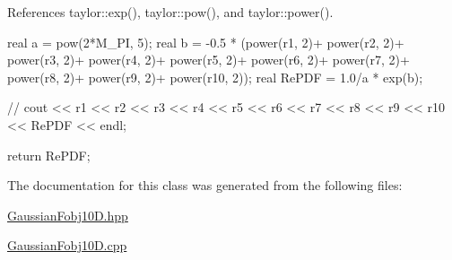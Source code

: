 \-References taylor\-::exp(), taylor\-::pow(), and taylor\-::power().


\begin{DoxyCode}
{
    real a = pow(2*M_PI, 5);
    real b = -0.5 * (power(r1, 2)+ power(r2, 2)+ power(r3, 2)+
        power(r4, 2)+ power(r5, 2)+ power(r6, 2)+ power(r7, 2)+
        power(r8, 2)+ power(r9, 2)+ power(r10, 2));
    real RePDF = 1.0/a * exp(b);
    
  //  cout << r1 << r2 << r3 << r4 << r5 << r6 << r7 << r8 << r9 << r10 <<
       RePDF << endl;
    
    return RePDF;
}
\end{DoxyCode}


\-The documentation for this class was generated from the following files\-:\begin{DoxyCompactItemize}
\item 
\hyperlink{GaussianFobj10D_8hpp}{\-Gaussian\-Fobj10\-D.\-hpp}\item 
\hyperlink{GaussianFobj10D_8cpp}{\-Gaussian\-Fobj10\-D.\-cpp}\end{DoxyCompactItemize}
